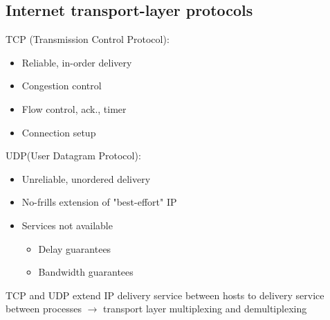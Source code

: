 \documentclass{article}[18pt]
\begin{document}
\subsection{Internet transport-layer protocols}
TCP (Transmission Control Protocol):
\begin{itemize}
	\item Reliable, in-order delivery
	\item Congestion control
	\item Flow control, ack., timer
	\item Connection setup
\end{itemize}
UDP(User Datagram Protocol):
\begin{itemize}
	\item Unreliable, unordered delivery
	\item No-frills extension of "best-effort" IP
	\item Services not available
	\begin{itemize}
		\item Delay guarantees
		\item Bandwidth guarantees
	\end{itemize}
\end{itemize}
TCP and UDP extend IP delivery service between hosts to delivery service between processes $\rightarrow$ transport layer multiplexing and demultiplexing
\end{document}
